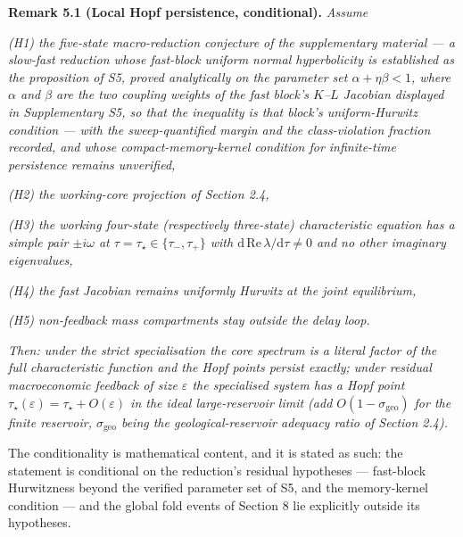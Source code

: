 \documentclass[11pt]{article}
\begin{document}
\textbf{Remark 5.1 (Local Hopf persistence, conditional).} \emph{Assume}

\emph{(H1) the five-state macro-reduction conjecture of the
supplementary material --- a slow-fast reduction whose fast-block
uniform normal hyperbolicity is established as the proposition of S5,
proved analytically on the parameter set \(\alpha + \eta\beta < 1\),
where \(\alpha\) and \(\beta\) are the two coupling weights of the fast
block's \(K\)--\(L\) Jacobian displayed in Supplementary S5, so that the
inequality is that block's uniform-Hurwitz condition --- with the
sweep-quantified margin and the class-violation fraction recorded, and
whose compact-memory-kernel condition for infinite-time persistence
remains unverified,}

\emph{(H2) the working-core projection of Section 2.4,}

\emph{(H3) the working four-state (respectively three-state)
characteristic equation has a simple pair \(\pm i\omega\) at
\(\tau = \tau_\star \in \{\tau_-, \tau_+\}\) with
\(\mathrm{d\,Re}\,\lambda/\mathrm{d}\tau \ne 0\) and no other imaginary
eigenvalues,}

\emph{(H4) the fast Jacobian remains uniformly Hurwitz at the joint
equilibrium,}

\emph{(H5) non-feedback mass compartments stay outside the delay loop.}

\emph{Then: under the strict specialisation the core spectrum is a
literal factor of the full characteristic function and the Hopf points
persist exactly; under residual macroeconomic feedback of size
\(\varepsilon\) the specialised system has a Hopf point
\(\tau_\star(\varepsilon) = \tau_\star + O(\varepsilon)\) in the ideal
large-reservoir limit (add \(O(1 - \sigma_{\mathrm{geo}})\) for the
finite reservoir, \(\sigma_{\mathrm{geo}}\) being the
geological-reservoir adequacy ratio of Section 2.4).}

The conditionality is mathematical content, and it is stated as such:
the statement is conditional on the reduction's residual hypotheses ---
fast-block Hurwitzness beyond the verified parameter set of S5, and the
memory-kernel condition --- and the global fold events of Section 8 lie
explicitly outside its hypotheses.
\end{document}

